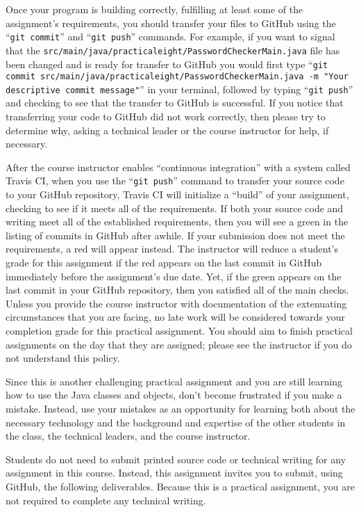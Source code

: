 \documentclass[11pt]{article}
\newcommand{\mainprogramsource}{\lstinline{src/main/java/practicaleight/PasswordCheckerMain.java}}
\newcommand{\gitcommit}{\command{git commit}}
\newcommand{\gitpush}{\command{git push}}
\newcommand{\gitcommitmainprogram}{\command{git commit src/main/java/practicaleight/PasswordCheckerMain.java -m "Your
descriptive commit message"}}
\newcommand{\command}[1]{``\lstinline{#1}''}
\newcommand{\step}[1]{``{#1}''}
\newcommand{\checkmark}{\ding{51}}
\newcommand{\naughtmark}{\ding{55}}
\begin{document}
Once your program is building correctly, fulfilling at least some of the
assignment's requirements, you should transfer your files to GitHub using the
\gitcommit{} and \gitpush{} commands. For example, if you want to signal that
the \mainprogramsource{} file has been changed and is ready for transfer to
GitHub you would first type \gitcommitmainprogram{} in your terminal, followed
by typing \gitpush{} and checking to see that the transfer to GitHub is
successful. If you notice that transferring your code to GitHub did not work
correctly, then please try to determine why, asking a technical leader or the
course instructor for help, if necessary.

After the course instructor enables \step{continuous integration} with a system
called Travis CI, when you use the \gitpush{} command to transfer your source
code to your GitHub repository, Travis CI will initialize a \step{build} of your
assignment, checking to see if it meets all of the requirements. If both your
source code and writing meet all of the established requirements, then you will
see a green \checkmark{} in the listing of commits in GitHub after awhile. If
your submission does not meet the requirements, a red \naughtmark{} will appear
instead. The instructor will reduce a student's grade for this assignment if the
red \naughtmark{} appears on the last commit in GitHub immediately before the
assignment's due date. Yet, if the green \checkmark{} appears on the last commit
in your GitHub repository, then you satisfied all of the main checks. Unless you
provide the course instructor with documentation of the extenuating
circumstances that you are facing, no late work will be considered towards your
completion grade for this practical assignment. You should aim to finish
practical assignments on the day that they are assigned; please see the
instructor if you do not understand this policy.

Since this is another challenging practical assignment and you are still
learning how to use the Java classes and objects, don't become frustrated if
you make a mistake. Instead, use your mistakes as an opportunity for learning
both about the necessary technology and the background and expertise of the
other students in the class, the technical leaders, and the course instructor.

\noindent Students do not need to submit printed source code or technical
writing for any assignment in this course. Instead, this assignment invites you
to submit, using GitHub, the following deliverables. Because this is a practical
assignment, you are not required to complete any technical writing.
\end{document}
